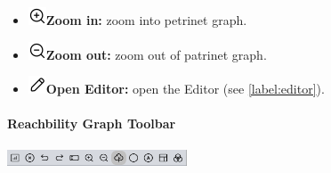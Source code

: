 \documentclass[10pt, a4paper]{article}
\begin{document}
\begin{itemize}
\item\includegraphics[scale=0.4]{../src/resources/images/Toolbar/zoom-in.png}\hspace{0.1cm}\textbf{Zoom in:} zoom into petrinet graph.
\item\includegraphics[scale=0.4]{../src/resources/images/Toolbar/zoom-out.png}\hspace{0.1cm}\textbf{Zoom out:} zoom out of patrinet graph.
\item\includegraphics[scale=0.4]{../src/resources/images/Toolbar/edit.png}\hspace{0.1cm}\textbf{Open Editor:} open the Editor (see \ref{label:editor}).
\end{itemize}

\paragraph{Reachbility Graph Toolbar}

\includegraphics[height=0.5cm]{Viewer_Reachability_Toolbar.png}
\end{document}
